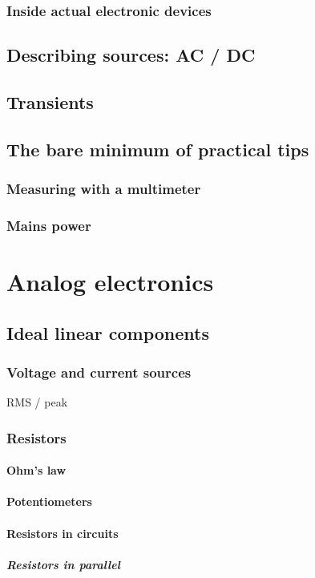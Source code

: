 \documentclass{report}
\begin{document}
\section{Inside actual electronic devices}
\chapter{Describing sources: AC / DC}

\chapter{Transients}
\chapter{The bare minimum of practical tips}
\section{Measuring with a multimeter}
\section{Mains power}

\part{Analog electronics}
\chapter{Ideal linear components}
\section{Voltage and current sources}
RMS / peak
\section{Resistors}
\subsection{Ohm's law}
\subsection{Potentiometers}
\subsection{Resistors in circuits}
\subsubsection{Resistors in parallel}
\end{document}
